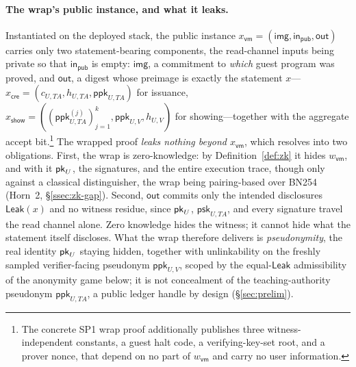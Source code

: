 \paragraph{The wrap's public instance, and what it leaks.}
Instantiated on the deployed stack, the public instance $x_{\mathsf{vm}}=(\mathsf{img},\mathsf{in}_{\mathsf{pub}},\mathsf{out})$ carries only two statement-bearing components, the read-channel inputs being private so that $\mathsf{in}_{\mathsf{pub}}$ is empty: $\mathsf{img}$, a commitment to \emph{which} guest program was proved, and $\mathsf{out}$, a digest whose preimage is exactly the statement $x$---$x_{\mathsf{cre}}=(c_{U,TA},h_{U,TA},\mathsf{ppk}_{U,TA})$ for issuance, $x_{\mathsf{show}}=((\mathsf{ppk}_{U,TA}^{(j)})_{j=1}^{k},\mathsf{ppk}_{U,V},h_{U,V})$ for showing---together with the aggregate accept bit.\footnote{The concrete SP1 wrap proof additionally publishes three witness-independent constants, a guest halt code, a verifying-key-set root, and a prover nonce, that depend on no part of $w_{\mathsf{vm}}$ and carry no user information.} The wrapped proof \emph{leaks nothing beyond $x_{\mathsf{vm}}$}, which resolves into two obligations. First, the wrap is zero-knowledge: by Definition~\ref{def:zk} it hides $w_{\mathsf{vm}}$, and with it $\mathsf{pk}_U$, the signatures, and the entire execution trace, though only against a classical distinguisher, the wrap being pairing-based over {BN254} (Horn~2, \S\ref{ssec:zk-gap}). Second, $\mathsf{out}$ commits only the intended disclosures $\mathsf{Leak}(x)$ and no witness residue, since $\mathsf{pk}_U$, $\mathsf{psk}_{U,TA}$, and every signature travel the read channel alone. Zero knowledge hides the witness; it cannot hide what the statement itself discloses. What the wrap therefore delivers is \emph{pseudonymity}, the real identity $\mathsf{pk}_U$ staying hidden, together with unlinkability on the freshly sampled verifier-facing pseudonym $\mathsf{ppk}_{U,V}$, scoped by the equal-$\mathsf{Leak}$ admissibility of the anonymity game below; it is not concealment of the teaching-authority pseudonym $\mathsf{ppk}_{U,TA}$, a public ledger handle by design (\S\ref{sec:prelim}).

